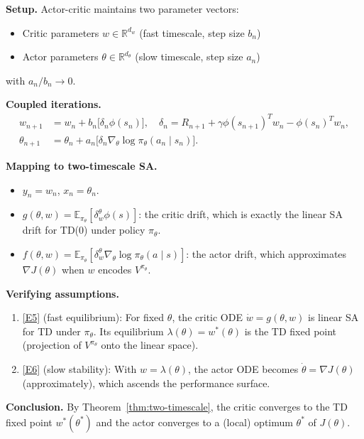 \documentclass[11pt,a4paper]{article}
\theoremstyle{definition}
\theoremstyle{plain}
\theoremstyle{remark}
\newcommand{\R}{\mathbb{R}}
\newcommand{\E}{\mathbb{E}}
\begin{document}
\begin{rlconnection}
\textbf{Setup.} Actor-critic maintains two parameter vectors:
\begin{itemize}[leftmargin=2em]
\item Critic parameters $w \in \R^{d_w}$ (fast timescale, step size $b_n$)
\item Actor parameters $\theta \in \R^{d_\theta}$ (slow timescale, step size $a_n$)
\end{itemize}
with $a_n / b_n \to 0$.

\textbf{Coupled iterations.}
\begin{align*}
  w_{n+1} &= w_n + b_n \bigl[\delta_n \phi(s_n) \bigr], \quad
    \delta_n = R_{n+1} + \gamma \phi(s_{n+1})^T w_n - \phi(s_n)^T w_n, \\
  \theta_{n+1} &= \theta_n + a_n \bigl[\delta_n \nabla_\theta \log \pi_\theta(a_n \mid s_n)\bigr].
\end{align*}

\textbf{Mapping to two-timescale SA.}
\begin{itemize}[leftmargin=2em]
\item $y_n = w_n$, $x_n = \theta_n$.
\item $g(\theta, w) = \E_{\pi_\theta}[\delta^\theta_w \phi(s)]$: the critic drift,
  which is exactly the linear SA drift for TD(0) under policy $\pi_\theta$.
\item $f(\theta, w) = \E_{\pi_\theta}[\delta^\theta_w \nabla_\theta \log \pi_\theta(a \mid s)]$:
  the actor drift, which approximates $\nabla J(\theta)$ when $w$ encodes
  $V^{\pi_\theta}$.
\end{itemize}

\textbf{Verifying assumptions.}
\begin{enumerate}[leftmargin=2em]
\item \ref{E5} (fast equilibrium): For fixed $\theta$, the critic ODE
  $\dot{w} = g(\theta, w)$ is linear SA for TD under $\pi_\theta$. Its equilibrium
  $\lambda(\theta) = w^*(\theta)$ is the TD fixed point (projection of $V^{\pi_\theta}$
  onto the linear space).
\item \ref{E6} (slow stability): With $w = \lambda(\theta)$, the actor ODE becomes
  $\dot{\theta} = \nabla J(\theta)$ (approximately), which ascends the performance
  surface.
\end{enumerate}

\textbf{Conclusion.} By Theorem~\ref{thm:two-timescale}, the critic converges to the
TD fixed point $w^*(\theta^*)$ and the actor converges to a (local) optimum $\theta^*$
of $J(\theta)$.
\end{rlconnection}
\end{document}
